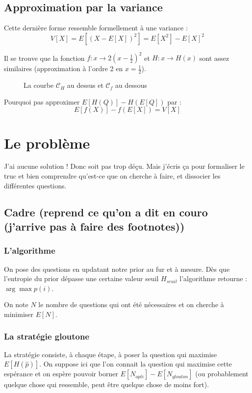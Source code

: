 \documentclass[12pt]{article}
\begin{document}
\subsection{Approximation par la variance}
Cette dernière forme ressemble formellement à une variance : 
\[V[X] = E[(X-E[X])^2] = E[X^2] - E[X]^2\]

Il se trouve que la fonction $f : x\rightarrow 2(x-\frac{1}{2})^2$ et $H : x\rightarrow H(x)$ sont assez similaires (approximation à l'ordre 2 en $x = \frac{1}{2}$).  
\begin{figure}[!h]
\caption{La courbe $\mathcal{C}_H$ au dessus et $\mathcal{C}_f$ au dessous}
\end{figure}

Pourquoi pas approximer $E[H(Q)] - H(E[Q])$ par : 
\[E[f(X)] - f(E[X]) = V[X]\]

\section{Le problème}

J'ai aucune solution ! Donc soit pas trop déçu. Mais j'écris ça pour formaliser le truc et bien comprendre qu'est-ce que on cherche à faire, et dissocier les différentes questions. 

\subsection{Cadre (reprend ce qu'on a dit en couro (j'arrive pas à faire des footnotes))}

\subsubsection{L'algorithme} On pose des questions en updatant notre prior au fur et à mesure. Dès que l'entropie du prior dépasse une certaine valeur seuil $H_{seuil}$ l'algorithme retourne :  $\arg \max p(i)$. 

On note $N$ le nombre de questions qui ont été nécessaires et on cherche à minimiser $E[N]$. 
\subsubsection{La stratégie gloutone}
La stratégie consiste, à chaque étape, à poser la question qui maximise $E[H(\hat{p})]$. On suppose ici que l'on connait la question qui maximise cette espérance et on espère pouvoir borner $E[N_{opti}] - E[N_{glouton}]$ (ou probablement quelque chose qui ressemble, peut être quelque chose de moins fort). 
\end{document}
